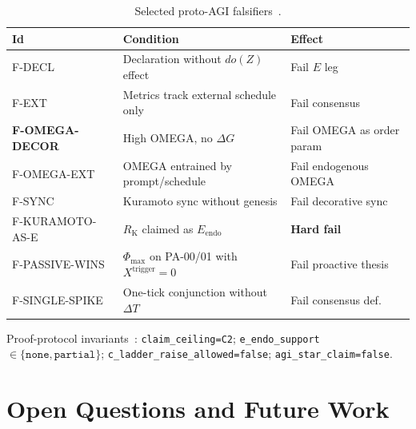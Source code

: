 \documentclass[11pt,a4paper]{article}
\theoremstyle{definition}
\begin{document}
\begin{table}[H]
\centering\small
\begin{tabular}{lp{5.5cm}p{3.5cm}}
\toprule Id & Condition & Effect \\ \midrule
F-DECL & Declaration without $do(Z)$ effect & Fail $E$ leg \\
F-EXT & Metrics track external schedule only & Fail consensus \\
\textbf{F-OMEGA-DECOR} & High OMEGA, no $\Delta G$ & Fail OMEGA as order param \\
F-OMEGA-EXT & OMEGA entrained by prompt/schedule & Fail endogenous OMEGA \\
F-SYNC & Kuramoto sync without genesis & Fail decorative sync \\
F-KURAMOTO-AS-E & $R_{\mathrm{K}}$ claimed as $E_{\mathrm{endo}}$ & \textbf{Hard fail} \\
F-PASSIVE-WINS & $\Phi_{\max}$ on PA-00/01 with $X^{\mathrm{trigger}}=0$ & Fail proactive thesis \\
F-SINGLE-SPIKE & One-tick conjunction without $\Delta T$ & Fail consensus def. \\ \bottomrule
\end{tabular}
\caption{Selected proto-AGI falsifiers~\cite{kuznetsov2026proto}.}
\label{tab:falsifiers}
\end{table}

Proof-protocol invariants~\cite{kuznetsov2026proof}:
\texttt{claim\_ceiling=C2}; \texttt{e\_endo\_support}$\in\{\texttt{none},\texttt{partial}\}$; \texttt{c\_ladder\_raise\_allowed=false}; \texttt{agi\_star\_claim=false}.

\section{Open Questions and Future Work}\label{sec:open}
\end{document}

